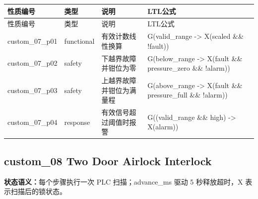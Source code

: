 \begin{longtable}{L{2.3cm}L{1.7cm}L{4.1cm}L{5.2cm}}

\toprule

性质编号 & 类型 & 说明 & LTL公式\\

\midrule

\endfirsthead

\toprule

性质编号 & 类型 & 说明 & LTL公式\\

\midrule

\endhead

{\ttfamily custom\_07\_p01} & functional & 有效计数线性换算 & {\ttfamily G(valid\_range -> X(scaled \&\& !fault))}\\

{\ttfamily custom\_07\_p02} & safety & 下越界故障并钳位为零 & {\ttfamily G(below\_range -> X(fault \&\& pressure\_zero \&\& !alarm))}\\

{\ttfamily custom\_07\_p03} & safety & 上越界故障并钳位为满量程 & {\ttfamily G(above\_range -> X(fault \&\& pressure\_full \&\& !alarm))}\\

{\ttfamily custom\_07\_p04} & response & 有效信号超过阈值时报警 & {\ttfamily G((valid\_range \&\& high) -> X(alarm))}\\

\bottomrule

\end{longtable}

\subsection{{\ttfamily custom\_08} Two Door Airlock Interlock}

\noindent\textbf{状态语义：}每个步骤执行一次 PLC 扫描；advance\_ms 驱动 5 秒释放超时，X 表示扫描后的锁状态。

